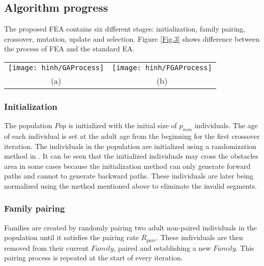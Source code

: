 \documentclass[final]{elsarticle}
\begin{document}
\subsection{Algorithm progress}

The proposed FEA contains six different stages: initialization, family pairing, crossover, mutation, update and selection. Figure \ref{Fig.3} shows difference between the process of FEA and the standard EA.
\begin{figure*}[h]
	\begin{tabular}{cc}
		\texttt{[image: hinh/GAProcess]}&\texttt{[image: hinh/FGAProcess]}\\
		(a)  &(b) \\
	\end{tabular}
	\centering
	\caption{The algorithm process of EA (a) and FEA (b)
	}
	\label{Fig.3}       %
\end{figure*}

\subsubsection{Initialization}

The population $Pop$ is initialized with the initial size of $p_{min}$ individuals. The age of each individual is set at the adult age from the beginning for the first crossover iteration. The individuals in the population are initialized using a randomization method in \cite{binh2019efficient}. It can be seen that the initialized individuals may cross the obstacles area in some cases because the initialization method can only generate forward paths and cannot to generate backward paths. These individuals are later being normalized using the method mentioned above to eliminate the invalid segments.

\subsubsection{Family pairing}

Families are created by randomly pairing two adult non-paired individuals in the population until it satisfies the pairing rate $R_{pair}$. These individuals are then removed from their current $ Family $, paired and establishing a new $Family$. This pairing process is repeated at the start of every iteration.
\end{document}
